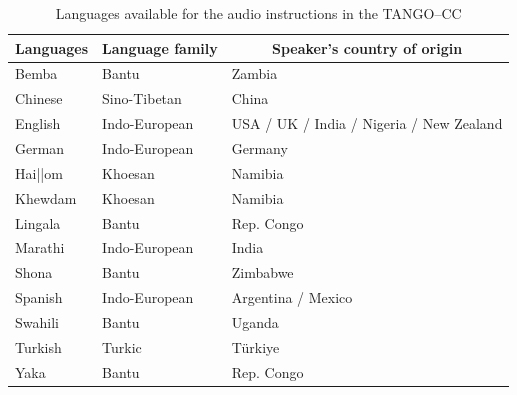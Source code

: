 \documentclass[
  man,floatsintext]{apa7}
\begin{document}
\begin{table}[tbp]

\begin{center}
\begin{threeparttable}

\caption{\label{tab:langtab}Languages available for the audio instructions in the TANGO--CC}

\begin{tabular}{lll}
\toprule
Languages & \multicolumn{1}{c}{Language family} & \multicolumn{1}{c}{Speaker's country of origin}\\
\midrule
Bemba & Bantu & Zambia\\
Chinese & Sino-Tibetan & China\\
English & Indo-European & USA / UK / India / Nigeria / New Zealand\\
German & Indo-European & Germany\\
Hai||om & Khoesan & Namibia\\
Khewdam & Khoesan & Namibia\\
Lingala & Bantu & Rep. Congo\\
Marathi & Indo-European & India\\
Shona & Bantu & Zimbabwe\\
Spanish & Indo-European & Argentina / Mexico\\
Swahili & Bantu & Uganda\\
Turkish & Turkic & Türkiye\\
Yaka & Bantu & Rep. Congo\\
\bottomrule
\end{tabular}

\end{threeparttable}
\end{center}

\end{table}
\end{document}
